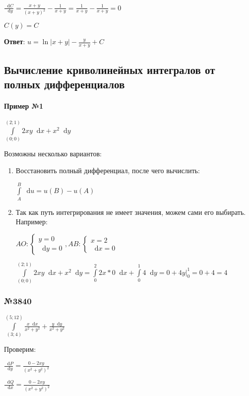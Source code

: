 \documentclass{article}
\newcommand*\diff{\mathop{}\!\mathrm{d}}
\begin{document}
$\frac{\diff C}{\diff y} = \frac{x + y}{(x + y)^2} - \frac{1}{x + y} = \frac{1}{x + y} - \frac{1}{x + y} = 0$

$C(y) = C$

\textbf{Ответ}: $u = \ln |x + y| - \frac{y}{x + y} + C$

\subsection{Вычисление криволинейных интегралов от полных дифференциалов}

\paragraph{Пример №1} $\int\limits_{(0; 0)}^{(2; 1)} 2 xy \diff x + x^2 \diff y$

Возможны несколько вариантов:

\begin{enumerate}
    \item Восстановить полный дифференциал, после чего вычислить:
    
    $\int\limits_{A}^{B} \diff u = u(B) - u(A)$
    \item Так как путь интегрирования не имеет значения, можем сами его выбирать. Например:
    
    $AO: \begin{cases}
        y = 0 \\
        \diff y = 0
    \end{cases}, AB: \begin{cases}
        x = 2 \\
        \diff x = 0
    \end{cases}$

    $\int\limits_{(0; 0)}^{(2; 1)} 2 xy \diff x + x^2 \diff y = \int\limits_{0}^{2} 2x * 0 \diff x + \int\limits_{0}^{1} 4 \diff y = 0 + 4y \bigg|_{0}^{1} = 0 + 4 = 4$
\end{enumerate}

\subsubsection{№3840}

$\int\limits_{(3;4)}^{(5;12)} \frac{x \diff x}{x^2 + y^2} + \frac{y \diff y}{x^2 + y^2}$

Проверим:

$\frac{\diff P}{\diff y} = \frac{0 - 2xy}{(x^2 + y^2)^2}$

$\frac{\diff Q}{\diff x} = \frac{0 - 2xy}{(x^2 + y^2)^2}$
\end{document}
